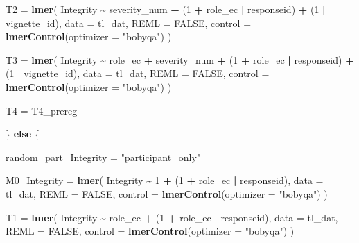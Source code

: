 \documentclass[
]{article}
\newenvironment{Shaded}{\begin{snugshade}}{\end{snugshade}}
\newcommand{\AttributeTok}[1]{\textcolor[rgb]{0.13,0.29,0.53}{#1}}
\newcommand{\ConstantTok}[1]{\textcolor[rgb]{0.56,0.35,0.01}{#1}}
\newcommand{\ControlFlowTok}[1]{\textcolor[rgb]{0.13,0.29,0.53}{\textbf{#1}}}
\newcommand{\DecValTok}[1]{\textcolor[rgb]{0.00,0.00,0.81}{#1}}
\newcommand{\FunctionTok}[1]{\textcolor[rgb]{0.13,0.29,0.53}{\textbf{#1}}}
\newcommand{\NormalTok}[1]{#1}
\newcommand{\OtherTok}[1]{\textcolor[rgb]{0.56,0.35,0.01}{#1}}
\newcommand{\SpecialCharTok}[1]{\textcolor[rgb]{0.81,0.36,0.00}{\textbf{#1}}}
\newcommand{\StringTok}[1]{\textcolor[rgb]{0.31,0.60,0.02}{#1}}
\begin{document}
\begin{Shaded}
\begin{Highlighting}[]
\NormalTok{  T2 }\OtherTok{=} \FunctionTok{lmer}\NormalTok{(}
\NormalTok{    Integrity }\SpecialCharTok{\textasciitilde{}}\NormalTok{ severity\_num }\SpecialCharTok{+}
\NormalTok{      (}\DecValTok{1} \SpecialCharTok{+}\NormalTok{ role\_ec }\SpecialCharTok{|}\NormalTok{ responseid) }\SpecialCharTok{+}
\NormalTok{      (}\DecValTok{1} \SpecialCharTok{|}\NormalTok{ vignette\_id),}
    \AttributeTok{data =}\NormalTok{ tl\_dat,}
    \AttributeTok{REML =} \ConstantTok{FALSE}\NormalTok{,}
    \AttributeTok{control =} \FunctionTok{lmerControl}\NormalTok{(}\AttributeTok{optimizer =} \StringTok{"bobyqa"}\NormalTok{)}
\NormalTok{  )}

\NormalTok{  T3 }\OtherTok{=} \FunctionTok{lmer}\NormalTok{(}
\NormalTok{    Integrity }\SpecialCharTok{\textasciitilde{}}\NormalTok{ role\_ec }\SpecialCharTok{+}\NormalTok{ severity\_num }\SpecialCharTok{+}
\NormalTok{      (}\DecValTok{1} \SpecialCharTok{+}\NormalTok{ role\_ec }\SpecialCharTok{|}\NormalTok{ responseid) }\SpecialCharTok{+}
\NormalTok{      (}\DecValTok{1} \SpecialCharTok{|}\NormalTok{ vignette\_id),}
    \AttributeTok{data =}\NormalTok{ tl\_dat,}
    \AttributeTok{REML =} \ConstantTok{FALSE}\NormalTok{,}
    \AttributeTok{control =} \FunctionTok{lmerControl}\NormalTok{(}\AttributeTok{optimizer =} \StringTok{"bobyqa"}\NormalTok{)}
\NormalTok{  )}

\NormalTok{  T4 }\OtherTok{=}\NormalTok{ T4\_prereg}

\NormalTok{\} }\ControlFlowTok{else}\NormalTok{ \{}

\NormalTok{  random\_part\_Integrity }\OtherTok{=} \StringTok{"participant\_only"}

\NormalTok{  M0\_Integrity }\OtherTok{=} \FunctionTok{lmer}\NormalTok{(}
\NormalTok{    Integrity }\SpecialCharTok{\textasciitilde{}} \DecValTok{1} \SpecialCharTok{+}
\NormalTok{      (}\DecValTok{1} \SpecialCharTok{+}\NormalTok{ role\_ec }\SpecialCharTok{|}\NormalTok{ responseid),}
    \AttributeTok{data =}\NormalTok{ tl\_dat,}
    \AttributeTok{REML =} \ConstantTok{FALSE}\NormalTok{,}
    \AttributeTok{control =} \FunctionTok{lmerControl}\NormalTok{(}\AttributeTok{optimizer =} \StringTok{"bobyqa"}\NormalTok{)}
\NormalTok{  )}

\NormalTok{  T1 }\OtherTok{=} \FunctionTok{lmer}\NormalTok{(}
\NormalTok{    Integrity }\SpecialCharTok{\textasciitilde{}}\NormalTok{ role\_ec }\SpecialCharTok{+}
\NormalTok{      (}\DecValTok{1} \SpecialCharTok{+}\NormalTok{ role\_ec }\SpecialCharTok{|}\NormalTok{ responseid),}
    \AttributeTok{data =}\NormalTok{ tl\_dat,}
    \AttributeTok{REML =} \ConstantTok{FALSE}\NormalTok{,}
    \AttributeTok{control =} \FunctionTok{lmerControl}\NormalTok{(}\AttributeTok{optimizer =} \StringTok{"bobyqa"}\NormalTok{)}
\NormalTok{  )}


\end{Highlighting}
\end{Shaded}
\end{document}
